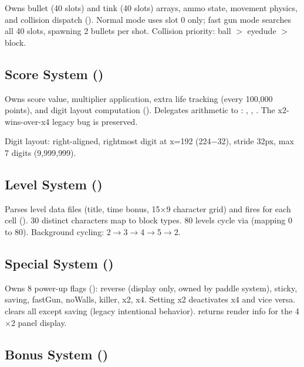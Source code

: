 \documentclass[11pt,a4paper]{article}
\begin{document}
Owns bullet (40 slots) and tink (40 slots) arrays, ammo state, movement physics, and collision dispatch (). Normal mode uses slot 0 only; fast gun mode searches all 40 slots, spawning 2 bullets per shot. Collision priority: ball $>$ eyedude $>$ block.

\subsection{Score System ()}
\label{sec:score-system}

Owns score value, multiplier application, extra life tracking (every 100{,}000 points), and digit layout computation (). Delegates arithmetic to : , , . The x2-wins-over-x4 legacy bug is preserved.

Digit layout: right-aligned, rightmost digit at x=192 (224$-$32), stride 32px, max 7 digits (9{,}999{,}999).

\subsection{Level System ()}
\label{sec:level-system}

Parses level data files (title, time bonus, 15$\times$9 character grid) and fires  for each cell (). 30 distinct characters map to block types. 80 levels cycle via  (mapping 0 to 80). Background cycling: 2$\rightarrow$3$\rightarrow$4$\rightarrow$5$\rightarrow$2.

\subsection{Special System ()}
\label{sec:special-system}

Owns 8 power-up flags (): reverse (display only, owned by paddle system), sticky, saving, fastGun, noWalls, killer, x2, x4. Setting x2 deactivates x4 and vice versa.  clears all except saving (legacy intentional behavior).  returns render info for the 4$\times$2 panel display.

\subsection{Bonus System ()}
\label{sec:bonus-system}
\end{document}
